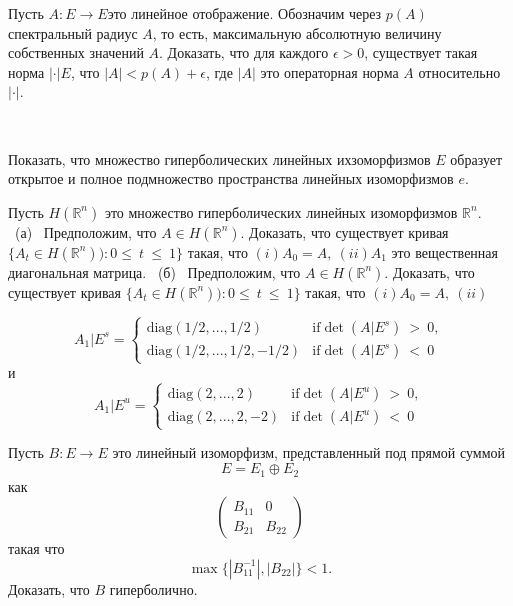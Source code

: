 \begin{exercise}
\label{exercise2_2} 
Пусть $A : E \rightarrow E$это линейное отображение. Обозначим через $p(A)$ спектральный радиус $A$, то есть, максимальную абсолютную величину собственных значений $A$. Доказать, что для каждого $\epsilon > 0$, существует такая норма $|\cdot| E$, что $|A| < p(A) + \epsilon$, где $|A|$  это операторная норма $A$ относительно $|\cdot|$.
\end{exercise} \\
\begin{exercise}
\label{exercise2_7} 
Показать, что множество гиперболических линейных ихзоморфизмов $E$ образует открытое и полное подмножество пространства линейных изоморфизмов $e$.
\end{exercise} 

\begin{exercise}
\label{exercise2_8} 
Пусть $H(\mathbb{R}^n)$ это множество гиперболических линейных изоморфизмов $\mathbb{R}^n$. \\
\ (а) \ Предположим, что $A \in H(\mathbb{R}^n)$. Доказать, что существует кривая $\{A_t \in H(\mathbb{R}^n)) : 0 \leqslant \ t \ \leqslant \ 1\}$ такая, что $(i) A_0 = A, \ (ii) A_1$ это вещественная диагональная матрица.
\ (б) \ Предположим, что $A \in H(\mathbb{R}^n)$. Доказать, что существует кривая $\{A_t \in H(\mathbb{R}^n)) : 0 \leqslant \ t \ \leqslant \ 1\}$ такая, что $(i) A_0 = A, \ (ii)$

$$
A_1 | E^s = \left\{
\begin{array}{lll}
\mathrm{diag}(1/2,...,1/2) & \mathrm{if} \det (A|E^s) \ > \ 0, \\
\mathrm{diag}(1/2,...,1/2,-1/2) & \mathrm{if} \det (A|E^s) \ < \ 0 
\end{array} 
\right.
$$
и
$$
A_1 | E^u = \left\{
\begin{array}{lll}
\mathrm{diag}(2,...,2) & \mathrm{if} \det (A|E^u) \ > \ 0, \\
\mathrm{diag}(2,...,2,-2) & \mathrm{if} \det (A|E^u) \ < \ 0 
\end{array}
\right.
$$
\end{exercise} 

\begin{exercise}
\label{exercise2_9} 
Пусть $B : E \rightarrow E$  это линейный изоморфизм, представленный под прямой суммой
$$
E = E_1 \oplus E_2
$$
как 
$$
 \left(
\begin{array}{lll}
B_{11} & 0 \\ 
B_{21} & B_{22}
\end{array} 
\right)
$$
такая что
$$
\max\{|B^{-1}_{11}|, |B_{22}|\}< 1.
$$
Доказать, что $B$ гиперболично.
\end{exercise} 

